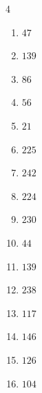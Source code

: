 \begin{multicols}{4}
\begin{enumerate}
  \item $47$


  \item $139$


  \item $86$


  \item $56$


  \item $21$


  \item $225$


  \item $242$


  \item $224$


\columnbreak %

  \item $230$


  \item $44$


  \item $139$


  \item $238$


  \item $117$


  \item $146$


  \item $126$


  \item $104$


\end{enumerate}
\end{multicols}

